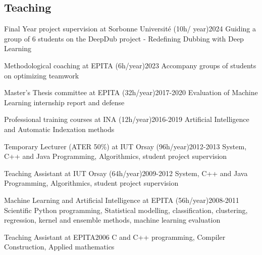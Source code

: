 \begin{en}
\subsection{Teaching}

\begin{jobshort}{Final Year project supervision at Sorbonne Université (10h/ year)}{2024}
Guiding a group of 6 students on the DeepDub project - Redefining Dubbing with Deep Learning
\end{jobshort}

\begin{jobshort}{Methodological coaching at EPITA (6h/year)}{2023}
Accompany groups of students on optimizing teamwork
\end{jobshort}

\begin{jobshort}{Master's Thesis committee at EPITA (32h/year)}{2017-2020}
Evaluation of Machine Learning internship report and defense
\end{jobshort}

\begin{jobshort}{Professional training courses at INA (12h/year)}{2016-2019}
Artificial Intelligence and Automatic Indexation methods
\end{jobshort}

\begin{jobshort}{Temporary Lecturer (ATER 50\%) at IUT Orsay (96h/year)}{2012-2013}
System, C++ and Java Programming, Algorithmics, student project supervision
\end{jobshort}

\begin{jobshort}{Teaching Assistant at IUT Orsay (64h/year)}{2009-2012}
System, C++ and Java Programming, Algorithmics, student project supervision
\end{jobshort}

\begin{jobshort}{Machine Learning and Artificial Intelligence at EPITA (56h/year)}{2008-2011}
Scientific Python programming, Statistical modelling, classification, clustering, regression, kernel and ensemble methods, machine learning evaluation
\end{jobshort}

\begin{jobshort}{Teaching Assistant at EPITA}{2006}
C and C++ programming, Compiler Construction, Applied mathematics
\end{jobshort}

\end{en}


